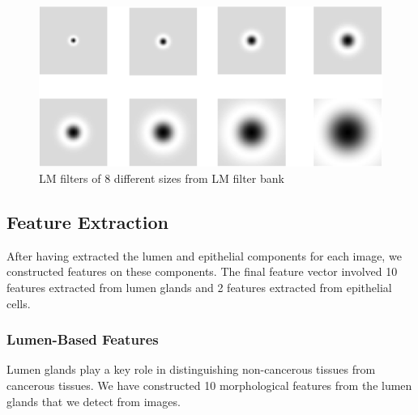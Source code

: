 \begin{figure}[!htb]
\includegraphics[width=\linewidth]{figs/lmf.png}
\caption{LM filters of 8 different sizes from LM filter bank}
\label{fig:log_filters8}
\end{figure}



\subsection{Feature Extraction}
After having extracted the lumen and epithelial components for each image, we constructed features on these components. The final feature vector involved 10 features extracted from lumen glands and 2 features extracted from epithelial cells.

\subsubsection{Lumen-Based Features}
Lumen glands play a key role in distinguishing non-cancerous tissues from cancerous tissues. We have constructed 10 morphological features from the lumen glands that we detect from images.

